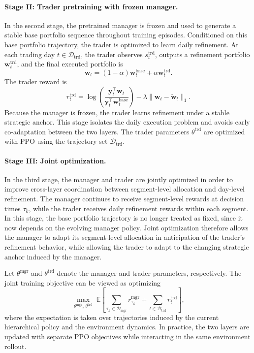 \documentclass[letterpaper]{article} %
\begin{document}
\paragraph{Stage II: Trader pretraining with frozen manager.}
In the second stage, the pretrained manager is frozen and used to generate a stable base portfolio sequence throughout training episodes. Conditioned on this base portfolio trajectory, the trader is optimized to learn daily refinement. At each trading day \(t\in\mathcal{D}_{\mathrm{trd}}\), the trader observes \(s_t^{\mathrm{trd}}\), outputs a refinement portfolio \(\mathbf{w}_t^{\mathrm{trd}}\), and the final executed portfolio is
\[
\mathbf{w}_t
=
(1-\alpha)\mathbf{w}_t^{\mathrm{base}}
+
\alpha \mathbf{w}_t^{\mathrm{trd}}.
\]
The trader reward is
\[
r_t^{\mathrm{trd}}
=
\log\!\left(
\frac{\mathbf{y}_t^\top \mathbf{w}_t}
{\mathbf{y}_t^\top \mathbf{w}_t^{\mathrm{base}}}
\right)
-
\lambda \|\mathbf{w}_t-\tilde{\mathbf{w}}_t\|_1.
\]
Because the manager is frozen, the trader learns refinement under a stable strategic anchor. This stage isolates the daily execution problem and avoids early co-adaptation between the two layers. The trader parameters \(\theta^{\mathrm{trd}}\) are optimized with PPO using the trajectory set \(\mathcal{D}_{\mathrm{trd}}\).

\paragraph{Stage III: Joint optimization.}
In the third stage, the manager and trader are jointly optimized in order to improve cross-layer coordination between segment-level allocation and day-level refinement. The manager continues to receive segment-level rewards at decision times \(\tau_k\), while the trader receives daily refinement rewards within each segment. In this stage, the base portfolio trajectory is no longer treated as fixed, since it now depends on the evolving manager policy. Joint optimization therefore allows the manager to adapt its segment-level allocation in anticipation of the trader's refinement behavior, while allowing the trader to adapt to the changing strategic anchor induced by the manager.

Let \(\theta^{\mathrm{mgr}}\) and \(\theta^{\mathrm{trd}}\) denote the manager and trader parameters, respectively. The joint training objective can be viewed as optimizing
\[
\max_{\theta^{\mathrm{mgr}},\,\theta^{\mathrm{trd}}}
\;
\mathbb{E}\!\left[
\sum_{\tau_k\in\mathcal{D}_{\mathrm{mgr}}}
r_{\tau_k}^{\mathrm{mgr}}
+
\sum_{t\in\mathcal{D}_{\mathrm{trd}}}
r_t^{\mathrm{trd}}
\right],
\]
where the expectation is taken over trajectories induced by the current hierarchical policy and the environment dynamics. In practice, the two layers are updated with separate PPO objectives while interacting in the same environment rollout.
\end{document}
